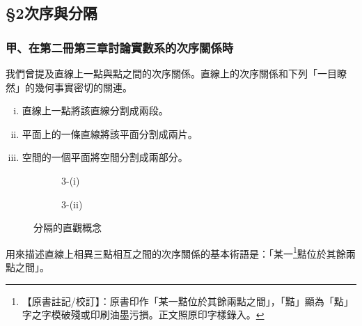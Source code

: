 \subsection*{\S 2\quad 次序與分隔}
\label{sec:b3s_a1_2}

\subsubsection*{甲、在第二冊第三章討論實數系的次序關係時}

我們曾提及直線上一點與點之間的次序關係。直線上的次序關係和下列「一目瞭然」的幾何事實密切的關連。
\begin{enumerate}[(i), leftmargin=2.5em]
  \item 直線上一點將該直線分割成兩段。
  \item 平面上的一條直線將該平面分割成兩片。
  \item 空間的一個平面將空間分割成兩部分。
\end{enumerate}

\begin{figure}[H]
\centering
\begin{subfigure}[b]{0.45\textwidth}
\centering
{}
\caption{3-(i)}
\label{fig:b3s-a1-3-1}
\end{subfigure}
\hfill
\begin{subfigure}[b]{0.45\textwidth}
\centering
{}
\caption{3-(ii)}
\label{fig:b3s-a1-3-2}
\end{subfigure}
\caption{分隔的直觀概念}
\label{fig:b3s-a1-3}
\end{figure}

用來描述直線上相異三點相互之間的次序關係的基本術語是：「某一\label{note:b3s-a1-p263-point}\footnote{【原書註記/校訂】：原書印作「某一黠位於其餘兩點之間」，「黠」顯為「點」字之字模破殘或印刷油墨污損。正文照原印字樣錄入。}黠位於其餘兩點之間」。

